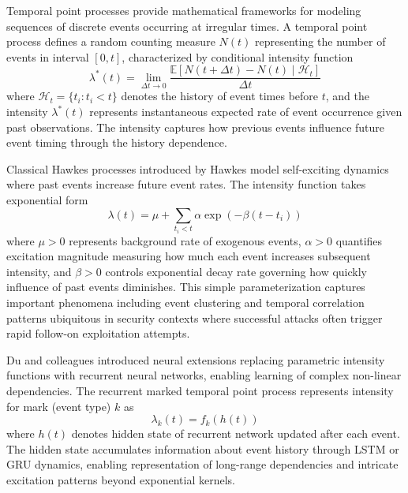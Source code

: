 \documentclass[10pt,journal,compsoc]{IEEEtran}
\begin{document}
Temporal point processes provide mathematical frameworks for modeling sequences of discrete events occurring at irregular times. A temporal point process defines a random counting measure $N(t)$ representing the number of events in interval $[0, t]$, characterized by conditional intensity function
\begin{equation}
\lambda^*(t) = \lim_{\Delta t \to 0} \frac{\mathbb{E}[N(t + \Delta t) - N(t) \mid \mathcal{H}_t]}{\Delta t}
\end{equation}
where $\mathcal{H}_t = \{t_i : t_i < t\}$ denotes the history of event times before $t$, and the intensity $\lambda^*(t)$ represents instantaneous expected rate of event occurrence given past observations. The intensity captures how previous events influence future event timing through the history dependence.

Classical Hawkes processes introduced by Hawkes model self-exciting dynamics where past events increase future event rates. The intensity function takes exponential form
\begin{equation}
\lambda(t) = \mu + \sum_{t_i < t} \alpha \exp(-\beta(t - t_i))
\end{equation}
where $\mu > 0$ represents background rate of exogenous events, $\alpha > 0$ quantifies excitation magnitude measuring how much each event increases subsequent intensity, and $\beta > 0$ controls exponential decay rate governing how quickly influence of past events diminishes. This simple parameterization captures important phenomena including event clustering and temporal correlation patterns ubiquitous in security contexts where successful attacks often trigger rapid follow-on exploitation attempts.

Du and colleagues introduced neural extensions replacing parametric intensity functions with recurrent neural networks, enabling learning of complex non-linear dependencies. The recurrent marked temporal point process represents intensity for mark (event type) $k$ as
\begin{equation}
\lambda_k(t) = f_k(h(t))
\end{equation}
where $h(t)$ denotes hidden state of recurrent network updated after each event. The hidden state accumulates information about event history through LSTM or GRU dynamics, enabling representation of long-range dependencies and intricate excitation patterns beyond exponential kernels.
\end{document}
